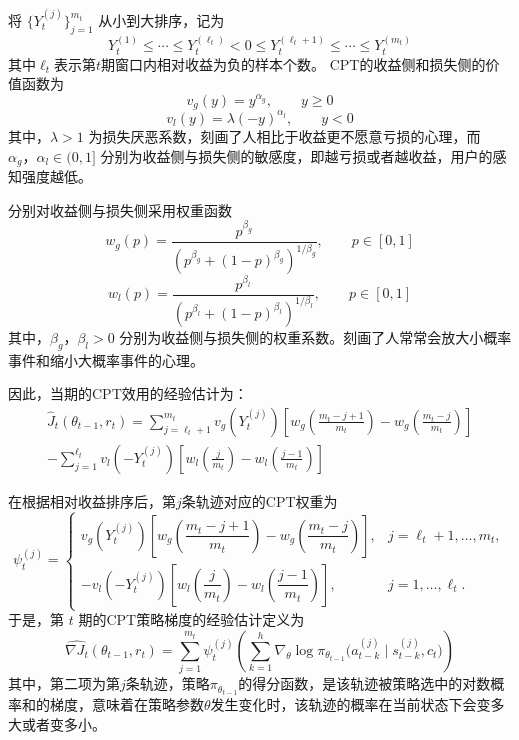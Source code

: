 将 $\{Y_t^{(j)}\}_{j=1}^{m_t}$ 从小到大排序，记为
\begin{equation}
Y_t^{(1)}\leq \cdots \leq Y_t^{(\ell_t)} < 0 \leq Y_t^{(\ell_t+1)} \leq \cdots \leq Y_t^{(m_t)}
\end{equation}
其中$\ell_t$表示第$t$期窗口内相对收益为负的样本个数。
CPT的收益侧和损失侧的价值函数为
\begin{equation}
v_g(y)
=y^{\alpha_g},
\qquad
y\ge 0
\end{equation}
\begin{equation}
v_l(y)
=\lambda (-y)^{\alpha_l},  
\qquad
y<0
\end{equation}
其中，$\lambda>1$ 为损失厌恶系数，刻画了人相比于收益更不愿意亏损的心理，而$\alpha_g，\alpha_l\in(0,1]$ 分别为收益侧与损失侧的敏感度，即越亏损或者越收益，用户的感知强度越低。

分别对收益侧与损失侧采用权重函数
\begin{equation}
w_g(p)
=
\frac{p^{\beta_g}}
{\left(p^{\beta_g}+(1-p)^{\beta_g}\right)^{1/\beta_g}},
\qquad
p\in[0,1]
\end{equation}
\begin{equation}
w_l(p)
=
\frac{p^{\beta_l}}
{\left(p^{\beta_l}+(1-p)^{\beta_l}\right)^{1/\beta_l}},
\qquad
p\in[0,1]
\end{equation}
其中，$\beta_g，\beta_l>0$ 分别为收益侧与损失侧的权重系数。刻画了人常常会放大小概率事件和缩小大概率事件的心理。

因此，当期的CPT效用的经验估计为：
\begin{equation}
\begin{aligned}
\widehat{J}_t(\theta_{t-1},r_t)
=
\sum_{j=\ell_t+1}^{m_t}
v_g\!\left(Y_t^{(j)}\right)
\left[
w_g\!\left(\frac{m_t-j+1}{m_t}\right)
-
w_g\!\left(\frac{m_t-j}{m_t}\right)
\right] \\
-
\sum_{j=1}^{\ell_t}
v_l\!\left(-Y_t^{(j)}\right)
\left[
w_l\!\left(\frac{j}{m_t}\right)
-
w_l\!\left(\frac{j-1}{m_t}\right)
\right]
\end{aligned}
\end{equation}


在根据相对收益排序后，第$j$条轨迹对应的CPT权重为
\begin{equation}
\psi_t^{(j)}
=
\begin{cases}
v_g\!\left(Y_t^{(j)}\right)
\left[
w_g\!\left(\dfrac{m_t-j+1}{m_t}\right)
-
w_g\!\left(\dfrac{m_t-j}{m_t}\right)
\right], & j=\ell_t+1,\dots,m_t, \\[1.2ex]
-
v_l\!\left(-Y_t^{(j)}\right)
\left[
w_l\!\left(\dfrac{j}{m_t}\right)
-
w_l\!\left(\dfrac{j-1}{m_t}\right)
\right], & j=1,\dots,\ell_t.
\end{cases}
\end{equation}
于是，第 $t$ 期的CPT策略梯度的经验估计定义为
\begin{equation}
\widehat{\nabla J_t}(\theta_{t-1},r_t)
=
\sum_{j=1}^{m_t}
\psi_t^{(j)}
\left(
\sum_{k=1}^{h}
\nabla_{\theta}
\log \pi_{\theta_{t-1}}
\bigl(
a_{t-k}^{(j)} \mid s_{t-k}^{(j)}, c_t
\bigr)
\right)
\end{equation}
其中，第二项为第$j$条轨迹，策略$\pi_{\theta_{t-1}}$的得分函数，是该轨迹被策略选中的对数概率和的梯度，意味着在策略参数$\theta$发生变化时，该轨迹的概率在当前状态下会变多大或者变多小。

